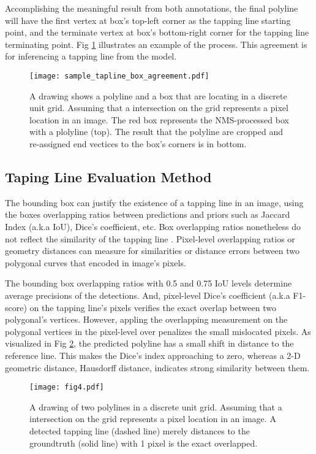 \documentclass[default,pdflatex,iicol]{sn-jnl}%
\begin{document}
Accomplishing the meaningful result from both annotations, the final polyline will have the first vertex at box's top-left corner as the tapping line starting point, and the terminate vertex at box's bottom-right corner for the tapping line terminating point. Fig \ref{fig-sampleagreement} illustrates an example of the process. This agreement is for inferencing a tapping line from the model.
\begin{figure}[h]%
\centering
\texttt{[image: sample\_tapline\_box\_agreement.pdf]}
\caption{A drawing shows a polyline and a box that are locating in a discrete unit grid. Assuming that a intersection on the grid represents a pixel location in an image. The red box represents the NMS-processed box with a plolyline (top). The result that the polyline are cropped and re-assigned end vectices to the box's corners is in bottom.
}\label{fig-sampleagreement}
\end{figure}

\subsection{Taping Line Evaluation Method}
The bounding box can justify the existence of a tapping line in an image, using the boxes overlapping ratios between predictions and priors such as Jaccard Index (a.k.a IoU), Dice's coefficient, etc. Box overlapping ratios nonetheless do not reflect the similarity of the tapping line \cite{Wongtanawijit_2021}. Pixel-level overlapping ratios or geometry distances can measure for similarities or distance errors between two polygonal curves that encoded in image's pixels.

The bounding box overlapping ratios with 0.5 and 0.75 IoU levels determine average precisions of the detections. And, pixel-level Dice's coefficient (a.k.a F1-score) on the tapping line's pixels verifies the exact overlap between two polygonal's vertices. However, appling the overlapping measurement on the polygonal vertices in the pixel-level over penalizes the small mislocated pixels. As visualized in Fig \ref{fig4-polyline}, the predicted polyline has a small shift in distance to the reference line. This makes the Dice's index approaching to zero, whereas a 2-D geometric distance, Hausdorff distance, indicates strong similarity between them.

\begin{figure}[h]%
\centering
\texttt{[image: fig4.pdf]}
\caption{A drawing of two polylines in a discrete unit grid. Assuming that a intersection on the grid represents a pixel location in an image. A detected tapping line (dashed line) merely distances to the groundtruth (solid line) with 1 pixel is the exact overlapped.}\label{fig4-polyline}
\end{figure}
\end{document}

